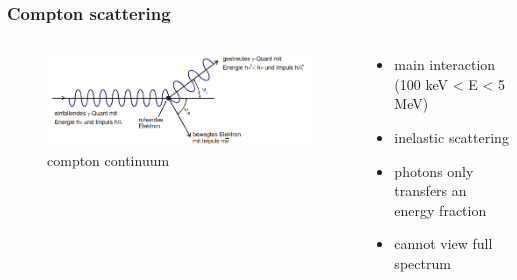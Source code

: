 \documentclass[aspectratio=1610, 9pt]{beamer}
\begin{document}
\begin{frame}\frametitle{Compton scattering}
  \begin{columns}
    \begin{column}[c]{0.48\textwidth}
      \begin{figure}
        \includegraphics[width=\textwidth]{plots/compton.png}
        \caption{compton continuum}
      \end{figure}
    \end{column}
    \begin{column}[c]{0.48\textwidth}
      \begin{itemize}
        \item main interaction (100 keV < E < 5 MeV)
        \item inelastic scattering
        \item photons only transfers an energy fraction
        \item cannot view full spectrum \frownie{}
      \end{itemize}
    \end{column}
  \end{columns}
\end{frame}
\end{document}
